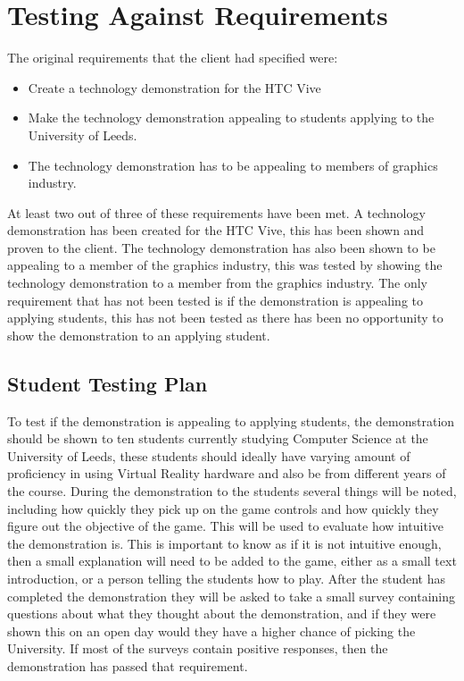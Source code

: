 \section{Testing Against Requirements}
	The original requirements that the client had specified were:

\begin{itemize}
	\item Create a technology demonstration for the HTC Vive
	\item Make the technology demonstration appealing to students applying to the University of Leeds.
	\item The technology demonstration has to be appealing to members of graphics industry.
\end{itemize}

	At least two out of three of these requirements have been met. A technology demonstration has been created for the HTC Vive, this has been shown and proven to the client. The technology demonstration has also been shown to be appealing to a member of the graphics industry, this was tested by showing the technology demonstration to a member from the graphics industry. The only requirement that has not been tested is if the demonstration is appealing to applying students, this has not been tested as there has been no opportunity to show the demonstration to an applying student.

\subsection{Student Testing Plan}
	To test if the demonstration is appealing to applying students, the demonstration should be shown to ten students currently studying Computer Science at the University of Leeds, these students should ideally have varying amount of proficiency in using Virtual Reality hardware and also be from different years of the course. During the demonstration to the students several things will be noted, including how quickly they pick up on the game controls and how quickly they figure out the objective of the game. This will be used to evaluate how intuitive the demonstration is. This is important to know as if it is not intuitive enough, then a small explanation will need to be added to the game, either as a small text introduction, or a person telling the students how to play. After the student has completed the demonstration they will be asked to take a small survey containing questions about what they thought about the demonstration, and if they were shown this on an open day would they have a higher chance of picking the University. If most of the surveys contain positive responses, then the demonstration has passed that requirement.

